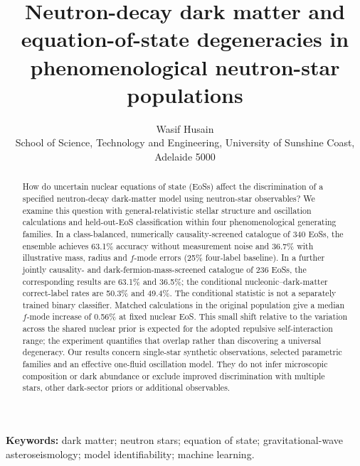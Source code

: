 \documentclass[11pt,a4paper]{article}
\title{Neutron-decay dark matter and equation-of-state degeneracies in phenomenological neutron-star populations}
\author{Wasif Husain\\ \small School of Science, Technology and Engineering, University of Sunshine Coast, Adelaide 5000}
\date{}
\begin{document}
\maketitle

\begin{abstract}
How do uncertain nuclear equations of state (EoSs) affect the discrimination of a specified neutron-decay dark-matter model using neutron-star observables? We examine this question with general-relativistic stellar structure and oscillation calculations and held-out-EoS classification within four phenomenological generating families. In a class-balanced, numerically causality-screened catalogue of 340 EoSs, the ensemble achieves 63.1\% accuracy without measurement noise and 36.7\% with illustrative mass, radius and $f$-mode errors (25\% four-label baseline). In a further jointly causality- and dark-fermion-mass-screened catalogue of 236 EoSs, the corresponding results are 63.1\% and 36.5\%; the conditional nucleonic--dark-matter correct-label rates are 50.3\% and 49.4\%. The conditional statistic is not a separately trained binary classifier. Matched calculations in the original population give a median $f$-mode increase of 0.56\% at fixed nuclear EoS. This small shift relative to the variation across the shared nuclear prior is expected for the adopted repulsive self-interaction range; the experiment quantifies that overlap rather than discovering a universal degeneracy. Our results concern single-star synthetic observations, selected parametric families and an effective one-fluid oscillation model. They do not infer microscopic composition or dark abundance or exclude improved discrimination with multiple stars, other dark-sector priors or additional observables.
\end{abstract}


\medskip
\noindent\textbf{Keywords:} dark matter; neutron stars; equation of state; gravitational-wave asteroseismology; model identifiability; machine learning.
\end{document}
